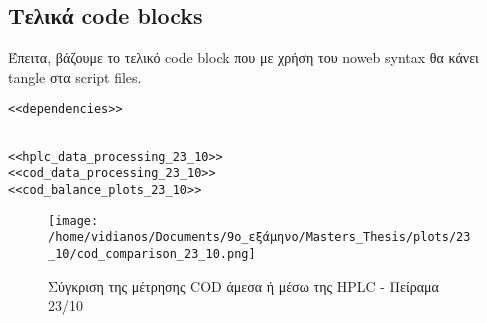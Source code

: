 \documentclass[11pt]{article}
\begin{document}
\subsection{Τελικά code blocks}
\label{sec:org3e4db11}
Έπειτα, βάζουμε το τελικό code block που με χρήση του noweb syntax θα κάνει tangle στα script files.

\begin{verbatim}
<<dependencies>>
\end{verbatim}

\begin{verbatim}

<<hplc_data_processing_23_10>>
<<cod_data_processing_23_10>>
<<cod_balance_plots_23_10>>

\end{verbatim}

\begin{figure}[htbp]
\centering
\texttt{[image: /home/vidianos/Documents/9o\_εξάμηνο/Masters\_Thesis/plots/23\_10/cod\_comparison\_23\_10.png]}
\caption{Σύγκριση της μέτρησης COD άμεσα ή μέσω της HPLC - Πείραμα 23/10}
\end{figure}
\end{document}

